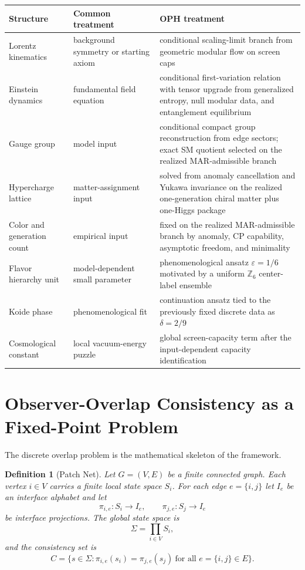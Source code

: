 \documentclass[11pt]{article}
\newtheorem{definition}[theorem]{Definition}
\begin{document}
\begingroup
\footnotesize
\begin{tabular}{@{}>{\raggedright\arraybackslash}p{}>{\raggedright\arraybackslash}p{}>{\raggedright\arraybackslash}p{}@{}}
\toprule
Structure & Common treatment & OPH treatment \\
\midrule
Lorentz kinematics & background symmetry or starting axiom & conditional scaling-limit branch from geometric modular flow on screen caps \\
Einstein dynamics & fundamental field equation & conditional first-variation relation with tensor upgrade from generalized entropy, null modular data, and entanglement equilibrium \\
Gauge group & model input & conditional compact group reconstruction from edge sectors; exact SM quotient selected on the realized MAR-admissible branch \\
Hypercharge lattice & matter-assignment input & solved from anomaly cancellation and Yukawa invariance on the realized one-generation chiral matter plus one-Higgs package \\
Color and generation count & empirical input & fixed on the realized MAR-admissible branch by anomaly, CP capability, asymptotic freedom, and minimality \\
Flavor hierarchy unit & model-dependent small parameter & phenomenological ansatz \(\varepsilon=1/6\) motivated by a uniform \(\mathbb Z_6\) center-label ensemble \\
Koide phase & phenomenological fit & continuation ansatz tied to the previously fixed discrete data as \(\delta=2/9\) \\
Cosmological constant & local vacuum-energy puzzle & global screen-capacity term after the input-dependent capacity identification \\
\bottomrule
\end{tabular}
\endgroup
\section{Observer-Overlap Consistency as a Fixed-Point Problem}

The discrete overlap problem is the mathematical skeleton of the framework.

\begin{definition}[Patch Net]\label{def:patchnet}
Let $G=(V,E)$ be a finite connected graph. Each vertex $i\in V$ carries a finite local state space $S_i$. For each edge $e=\{i,j\}$ let $I_e$ be an interface alphabet and let
\[
\pi_{i,e}:S_i\to I_e,
\qquad
\pi_{j,e}:S_j\to I_e
\]
be interface projections. The global state space is
\[
\Sigma=\prod_{i\in V} S_i,
\]
and the consistency set is
\[
C=\bigl\{s\in\Sigma:\pi_{i,e}(s_i)=\pi_{j,e}(s_j)\ \text{for all }e=\{i,j\}\in E\bigr\}.
\]
\end{definition}
\end{document}
